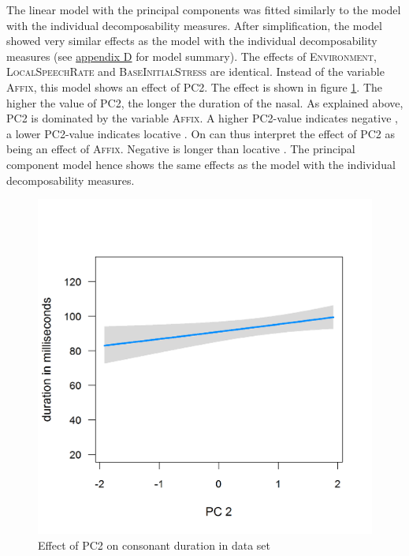 The linear model with the principal components was fitted similarly to the model with the individual decomposability measures. After simplification, the model showed very similar effects as the model with the individual decomposability measures (see \hyperref[Appendix D: model summaries corpus]{appendix D} for model summary). The effects of \textsc{Environment}, \textsc{LocalSpeechRate} and \textsc{BaseInitialStress} are identical. Instead of the variable \textsc{Affix}, this model shows an effect of \textsc{PC2}. The effect is shown in figure \ref{fig:PC2 in Corpus}. The higher the value of \textsc{PC2}, the longer the duration of the nasal. As explained above, \textsc{PC2} is dominated by the variable \textsc{Affix}. A higher \textsc{PC2}-value indicates negative , a lower \textsc{PC2}-value indicates locative . On can thus interpret the effect of \textsc{PC2} as being an effect of \textsc{Affix}. Negative  is longer than locative . The principal component model hence shows the same effects as the model with the individual decomposability measures.


\begin{figure} [h!]
	\centering
	\includegraphics [scale=0.4] {images/Corpus/imPCAbsPC2.png}
	\caption{Effect of PC2 on consonant duration in data set}
	\label{fig:PC2 in Corpus}
\end{figure}



